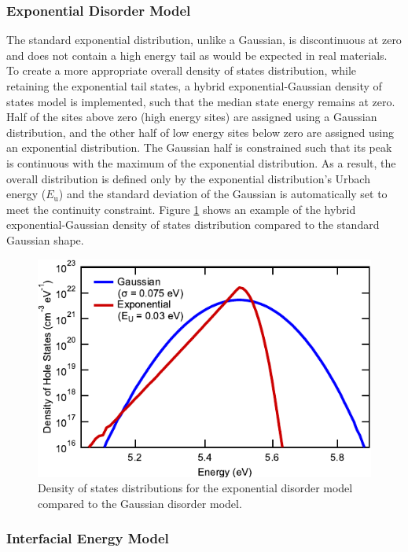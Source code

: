\documentclass[%
 reprint,onecolumn,notitlepage,
superscriptaddress,longbibliography,
 amsmath,amssymb,
 aps,rmp,floatfix,
]{revtex4-1}
\begin{document}
\subsubsection{Exponential Disorder Model}

The standard exponential distribution, unlike a Gaussian, is discontinuous at zero and does not contain a high energy tail as would be expected in real materials.
To create a more appropriate overall density of states distribution, while retaining the exponential tail states, a hybrid exponential-Gaussian density of states model is implemented, such that the median state energy remains at zero.
Half of the sites above zero (high energy sites) are assigned using a Gaussian distribution, and the other half of low energy sites below zero are assigned using an exponential distribution.
The Gaussian half is constrained such that its peak is continuous with the maximum of the exponential distribution.
As a result, the overall distribution is defined only by the exponential distribution's Urbach energy ($E_\text{u}$) and the standard deviation of the Gaussian is automatically set to meet the continuity constraint.
Figure \ref{fig:exponential_dos} shows an example of the hybrid exponential-Gaussian density of states distribution compared to the standard Gaussian shape.

\begin{figure}[h]
    \centering
    \includegraphics{DOS_shape_comparison.pdf}
    \caption{Density of states distributions for the exponential disorder model compared to the Gaussian disorder model.}
    \label{fig:exponential_dos}
\end{figure}

\subsubsection{Interfacial Energy Model}
\end{document}
